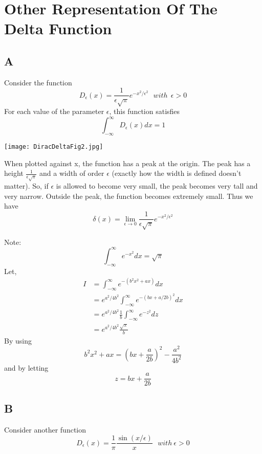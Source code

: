 \section*{Other Representation Of The Delta Function}
\subsection*{A}
Consider the function 
\begin{equation}
D_\epsilon (x) = \frac{1}{\epsilon \sqrt{\pi}} e^{-x^2/\epsilon^2} \ \ \ with\ \ \epsilon > 0
\end{equation}
For each value of the parameter $\epsilon$, this function satisfies $$\int_{-\infty}^\infty D_\epsilon (x)dx =1$$ 

\vspace{0.2cm}
\begin{center}
\texttt{[image: DiracDeltaFig2.jpg]}
\end{center}
When plotted against x, the function has a peak at the origin. The peak has a height $\frac{1}{\epsilon \sqrt{\pi}}$ and a width of order $\epsilon$ (exactly how the width is defined doesn't matter). So, if $\epsilon$ is allowed to become very small, the peak becomes very tall and very narrow. Outside the peak, the function becomes extremely small. Thus we have 
\begin{equation}
\delta (x) = \lim_{\epsilon \to 0} \frac{1}{\epsilon \sqrt{\pi}} e^{-x^2/\epsilon^2}
\end{equation}


Note: $$\int_{-\infty}^{\infty} e^{-x^2}dx = \sqrt{\pi}$$
Let, 
\begin{align*}
I &= \int_{-\infty}^{\infty} e^{-(b^2 x^2 + ax)} dx \\
&=e^{a^2/4b^2} \int_{-\infty}^{\infty} e^{-(bx + a/2b)^2} dx \\
&= e^{a^2/4b^2} \frac{1}{b} \int_{-\infty}^{\infty} e^{-z^2} dz \\
&= e^{a^2/4b^2} \frac{\sqrt{\pi}}{b}
\end{align*}
By using $$ b^2 x^2 + ax = (bx + \frac{a}{2b})^2 - \frac{a^2}{4b^2}$$ and by letting $$ z= bx+\frac{a}{2b}$$

\subsection*{B}
Consider another function
\begin{equation}
D_{\epsilon} (x) = \frac{1}{\pi} \frac{\sin (x/\epsilon)}{x} \ \ \ with\ \epsilon>0
\end{equation}

